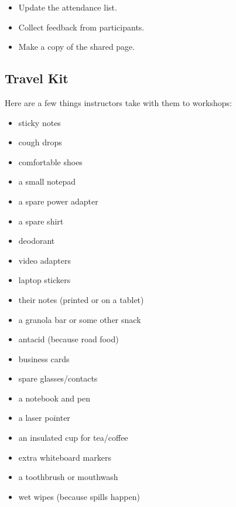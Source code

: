 \begin{itemize}

\item
  Update the attendance list.

\item
  Collect feedback from participants.

\item
  Make a copy of the shared page.

\end{itemize}

\subsection*{Travel Kit}

Here are a few things instructors take with them to workshops:

\begin{multicols}{2}

  \begin{itemize}
  \item sticky notes
  \item cough drops
  \item comfortable shoes
  \item a small notepad
  \item a spare power adapter
  \item a spare shirt
  \item deodorant
  \item video adapters
  \item laptop stickers
  \item their notes (printed or on a tablet)
  \end{itemize}

  \columnbreak

  \begin{itemize}
  \item a granola bar or some other snack
  \item antacid (because road food)
  \item business cards
  \item spare glasses/contacts
  \item a notebook and pen
  \item a laser pointer
  \item an insulated cup for tea/coffee
  \item extra whiteboard markers
  \item a toothbrush or mouthwash
  \item wet wipes (because spills happen)
  \end{itemize}

\end{multicols}

